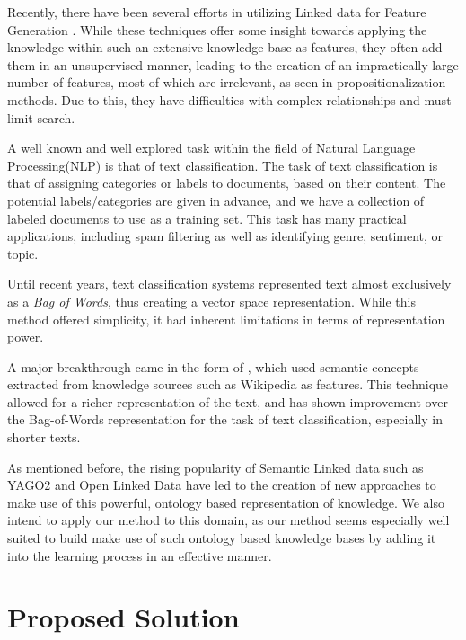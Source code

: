 \documentclass[letterpaper]{article}
\theoremstyle{definition}
\begin{document}
Recently, there have been several efforts in utilizing Linked data for Feature Generation \cite{cheng2011automated,paulheim2012unsupervised}. While these techniques offer some insight towards applying the knowledge within such an extensive knowledge base as features, they often add them in an unsupervised manner, leading to the creation of an impractically large number of features, most of which are irrelevant, as seen in propositionalization methods. Due to this, they have difficulties with complex relationships and must limit search.

A well known and well explored task within the field of Natural Language Processing(NLP) is that of text classification.
The task of text classification is that of assigning categories or labels to documents, based on their content. The potential labels/categories are given in advance, and we have a collection of labeled documents to use as a training set. This task has many practical applications, including spam filtering as well as identifying genre, sentiment, or topic.

Until recent years, text classification systems represented text almost exclusively as a \emph{Bag of Words}, thus creating a vector space representation\cite{salton1983introduction,Wu:1981:CST:1013228.511759}. While this method offered simplicity, it had inherent limitations in terms of representation power.

A major breakthrough came in the form of \cite{gabrilovich2006overcoming}, which used semantic concepts extracted from knowledge sources such as Wikipedia as features. This technique allowed for a richer representation of the text, and has shown improvement over the Bag-of-Words representation for the task of text classification, especially in shorter texts.

As mentioned before, the rising popularity of Semantic Linked data such as YAGO2\cite{hoffart2013yago2} and Open Linked Data\cite{bizer2009linked} have led to the creation of new approaches to make use of this powerful, ontology based representation of knowledge\cite{bloehdorn2007kernel,rios2014statistical}.
We also intend to apply our method to this domain, as our method seems especially well suited to build make use of such ontology based knowledge bases by adding it into the learning process in an effective manner.

\section{Proposed Solution}
\end{document}
